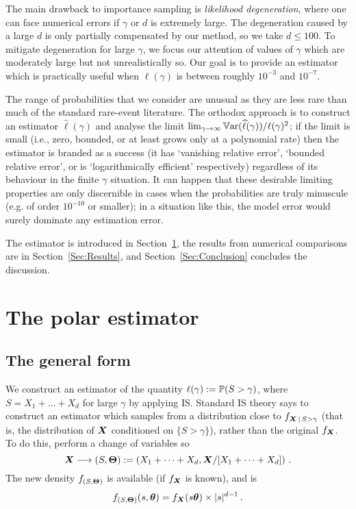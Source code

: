 The main drawback to importance sampling is \emph{likelihood degeneration}, where one can face numerical errors if $\gamma$ or $d$ is extremely large.
The degeneration caused by a large $d$ is only partially compensated by our method, so we take $d \le 100$.
To mitigate degeneration for large $\gamma$, we focus our attention of values of $\gamma$ which are moderately large but not unrealistically so.
Our goal is to provide an estimator which is practically useful when $\ell(\gamma)$ is between roughly $10^{-3}$ and $10^{-7}$.

The range of probabilities that we consider are unusual as they are less rare than much of the standard rare-event literature. The orthodox approach is to construct an estimator $\hat{\ell}(\gamma)$ and analyse the limit $\lim_{\gamma\to\infty} \operatorname{\mathbb{V}\mathrm{ar}}(\widehat{\ell}(\gamma))/\ell(\gamma)^2$; if the limit is small (i.e., zero, bounded, or at least grows only at a polynomial rate) then the estimator is branded as a success (it has `vanishing relative error', `bounded relative error', or is `logarithmically efficient' respectively) regardless of its behaviour in the finite $\gamma$ situation. It can happen that these desirable limiting properties are only discernible in cases when the probabilities are truly minuscule (e.g. of order $10^{-10}$ or smaller); in a situation like this, the model error would surely dominate any estimation error.

The estimator is introduced in Section~\ref{scn:Estimator}, the results from numerical comparisons are in Section~\ref{Sec:Results}, and Section~\ref{Sec:Conclusion} concludes the discussion.

\section{The polar estimator} \label{scn:Estimator}

\subsection{The general form}

We construct an estimator of the quantity $\ell(\gamma) := \operatorname{{\mathbb P}}(S > \gamma)$, where $S = X_1 + \dots + X_d$ for large $\gamma$ by applying IS.
Standard IS theory says to construct an estimator which samples from a distribution close to $f_{\bm{X} \,|\, S>\gamma}$ (that is, the distribution of $\bm{X}$ conditioned on $\{ S>\gamma \}$), rather than the original $f_{\bm{X}}$. To do this, perform a change of variables so
\[ \bm{X} \longrightarrow (S,\bm{\Theta}) := \left(X_1+\dots+X_d, \bm{X} / [X_1+\dots+X_d] \right) \,. \]
The new density $f_{(S,\bm{\Theta})}$ is available (if $f_{\bm{X}}$ is known), and is
\[
f_{(S,\bm{\Theta})}(s,\bm{\theta}) = f_{\bm{X}}(s\bm{\theta}) \times |s|^{d-1}\,.
\]

